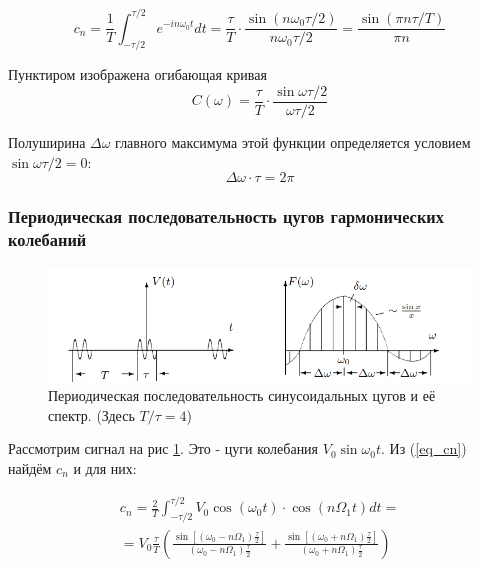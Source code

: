 \documentclass{article}
\begin{document}
\begin{equation}
    c_n = \frac{1}{T} \int_{-\tau/2}^{\tau/2} e^{-in\omega_0t}dt = \frac{\tau}{T} \cdot 
    \frac{\sin (n\omega_0\tau/2)}{n\omega_0\tau/2} = \frac{\sin (\pi n\tau/T)}{\pi n}
    \label{ep_cn_sq_imp}
\end{equation}

Пунктиром изображена огибающая кривая
\begin{equation*}
    C(\omega) = \frac{\tau}{T} \cdot \frac{\sin \omega \tau/2}{\omega\tau/2}
\end{equation*}

Полуширина \( \Delta \omega \) главного максимума этой функции определяется условием \( \sin \omega\tau/2 = 0 \):
\begin{equation*}
    \Delta\omega\cdot\tau = 2\pi
\end{equation*}




\subsubsection{Периодическая последовательность цугов гармонических колебаний}

\begin{figure}[H]
    \centering
    \includegraphics[width=\textwidth]{cug_imp_example.png}
    \caption{Периодическая последовательность синусоидальных цугов и её спектр. (Здесь \(T/\tau = 4\))} 
    \label{pic_cug_imp_example}
\end{figure}

Рассмотрим сигнал на рис \ref{pic_cug_imp_example}. Это - цуги колебания \( V_0\sin\omega_0t \).
Из (\ref{eq_cn}) найдём \(c_n\) и для них:

\begin{multline}
    c_n = \frac{2}{T}\int_{-\tau/2}^{\tau/2} V_0\cos(\omega_0t) \cdot \cos(n\Omega_1t)dt = \\
    = V_0 \frac{\tau}{T}\left(\frac{\sin\left[(\omega_0 - n\Omega_1)\frac{\tau}{2}\right]}
    {(\omega_0 - n\Omega_1)\frac{\tau}{2}} + \frac{\sin\left[(\omega_0 + n\Omega_1)\frac{\tau}{2}\right]}
    {(\omega_0 + n\Omega_1)\frac{\tau}{2}} \right)
    \label{eq_cn_cug}
\end{multline}
\end{document}
